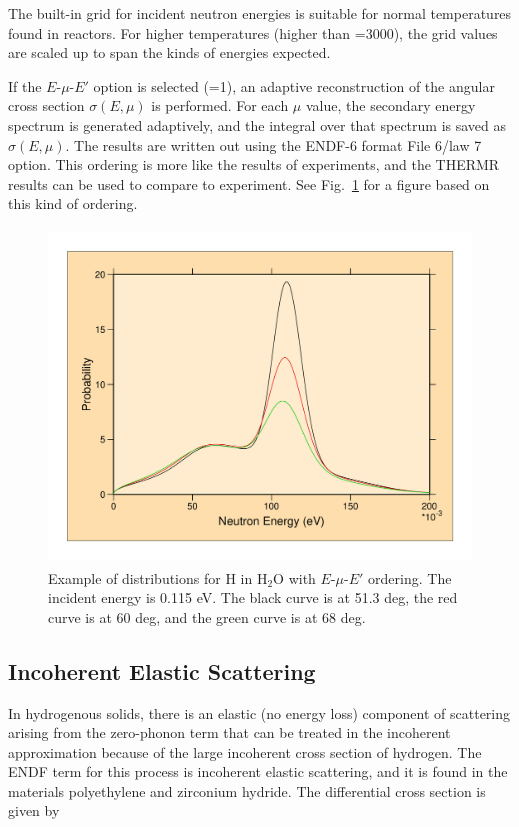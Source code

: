 The built-in grid for incident neutron energies is suitable for
normal temperatures found in reactors.  For higher temperatures
(higher than =3000), the grid values are scaled up
to span the kinds of energies expected.

If the $E$-$\mu$-$E'$ option is selected (=1), an
adaptive reconstruction of the angular cross section
$\sigma(E,\mu)$ is performed.  For each $\mu$ value, the
secondary energy spectrum is generated adaptively, and the
integral over that spectrum is saved as $\sigma(E,\mu)$.
The results are written out using the ENDF-6 format
File 6/law 7 option.  This ordering is more like the results
of experiments, and the THERMR results can be used to compare
to experiment.  See Fig.~\ref{ang2} for a figure based on
this kind of ordering.

\begin{figure}[thb]\centering
\includegraphics[keepaspectratio, height=3.5in, angle=0]{figs/thermr7ack}
\caption[Distributions for H in H$_2$O with $E$-$\mu$-$E'$ ordering]
{Example of distributions for H in H$_2$O with $E$-$\mu$-$E'$ ordering.  The
 incident energy is 0.115 eV.  The black curve is at 51.3 deg, the red
 curve is at 60 deg, and the green curve is at 68 deg.}
\label{ang2}
\end{figure}

\subsection{Incoherent Elastic Scattering}
\label{ssTHERMR_incoh_el}

In hydrogenous solids, there is an elastic (no energy loss) component
of scattering arising from the zero-phonon term that can be treated in
the incoherent approximation because of the large incoherent cross
section of hydrogen.  The ENDF term for this process is incoherent
elastic scattering, and it is found in the
materials polyethylene and zirconium hydride.
The differential cross section is given by

